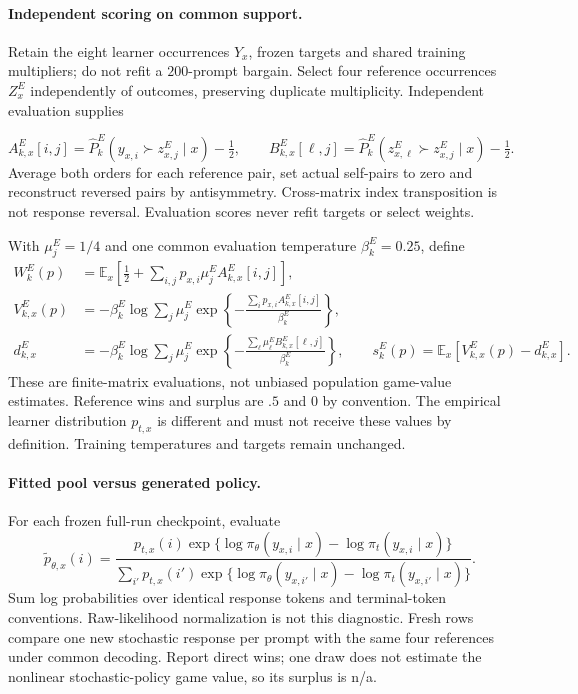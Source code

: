 \documentclass{article}
\theoremstyle{remark}
\theoremstyle{plain}
\newcommand{\E}{\mathbb{E}}
\begin{document}
\paragraph{Independent scoring on common support.}
Retain the eight learner occurrences $Y_x$, frozen targets and shared training multipliers; do not refit a $200$-prompt bargain. Select four reference occurrences $Z_x^E$ independently of outcomes, preserving duplicate multiplicity. Independent evaluation supplies

\[
 A^E_{k,x}[i,j]=\widehat P^E_k(y_{x,i}\succ z^E_{x,j}\mid x)-\tfrac12,
 \qquad
 B^E_{k,x}[\ell,j]=\widehat P^E_k(z^E_{x,\ell}\succ z^E_{x,j}\mid x)-\tfrac12.
\]
Average both orders for each reference pair, set actual self-pairs to zero and reconstruct reversed pairs by antisymmetry. Cross-matrix index transposition is not response reversal. Evaluation scores never refit targets or select weights.

With $\mu_j^E=1/4$ and one common evaluation temperature $\beta_k^E=0.25$, define
\begin{align}
 W_k^E(p)&=\E_x\left[\tfrac12+\sum_{i,j}p_{x,i}\mu_j^E A^E_{k,x}[i,j]\right],\label{eq:transfer-wins}\\
 V^E_{k,x}(p)&=-\beta_k^E\log\sum_j\mu_j^E
 \exp\!\left\{-\frac{\sum_i p_{x,i}A^E_{k,x}[i,j]}{\beta_k^E}\right\},\label{eq:transfer-value}\\
 d^E_{k,x}&=-\beta_k^E\log\sum_j\mu_j^E
 \exp\!\left\{-\frac{\sum_\ell\mu_\ell^E B^E_{k,x}[\ell,j]}{\beta_k^E}\right\},\qquad
 s_k^E(p)=\E_x[V^E_{k,x}(p)-d^E_{k,x}].\label{eq:transfer-surplus}
\end{align}
These are finite-matrix evaluations, not unbiased population game-value estimates. Reference wins and surplus are $.5$ and $0$ by convention. The empirical learner distribution $p_{t,x}$ is different and must not receive these values by definition. Training temperatures and targets remain unchanged.

\paragraph{Fitted pool versus generated policy.}
For each frozen full-run checkpoint, evaluate
\[
 \widetilde p_{\theta,x}(i)
 =\frac{p_{t,x}(i)\exp\{\log\pi_\theta(y_{x,i}\mid x)-\log\pi_t(y_{x,i}\mid x)\}}
 {\sum_{i'}p_{t,x}(i')\exp\{\log\pi_\theta(y_{x,i'}\mid x)-\log\pi_t(y_{x,i'}\mid x)\}}.
\]
Sum log probabilities over identical response tokens and terminal-token conventions. Raw-likelihood normalization is not this diagnostic. Fresh rows compare one new stochastic response per prompt with the same four references under common decoding. Report direct wins; one draw does not estimate the nonlinear stochastic-policy game value, so its surplus is n/a.
\end{document}
